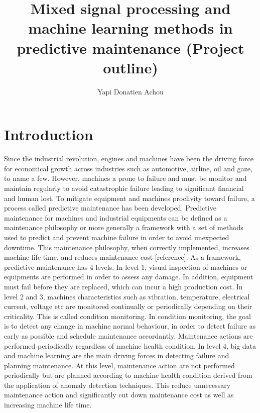\documentclass[11pt, oneside]{article}   	%
\title{Mixed signal processing and machine learning methods in predictive maintenance (Project outline)}
\author{Yapi Donatien Achou}
\begin{document}
\maketitle
\tableofcontents
\newpage
\section{Introduction}
Since the industrial revolution, engines and machines have been the driving force for economical growth across industries such as automotive, airline, oil and gaze, to name a few. However, machines a prone to failure and must be monitor and maintain regularly to avoid catastrophic failure leading to significant financial and human lost. To mitigate equipment and machines proclivity toward failure, a process called predictive maintenance has been developed. Predictive maintenance  for machines and industrial equipments can be defined as a maintenance philosophy or more generally a framework with a set of methods used to predict and prevent machine failure in order to avoid unexpected downtime. This maintenance philosophy, when correctly implemented, increases machine life time, and reduces maintenance cost [reference].
\justify
As a framework, predictive maintenance has 4 levels. In level 1, visual inspection of machines or equipments are performed in order to assess any damage.
In addition, equipment must fail before they are replaced, which can incur a high production cost. In level 2 and 3, machines characteristics such as vibration, temperature, electrical current, voltage etc are monitored continually or periodically depending on their criticality. This is called condition monitoring. In condition monitoring, the goal is to detect any change in machine normal behaviour, in order to detect failure as early as possible and schedule maintenance accordantly. Maintenance actions are performed periodically regardless of machine health condition. In level 4, big data and machine learning are the main driving forces in detecting failure and planning maintenance. At this level, maintenance action are not performed periodically but are planned according to machine health condition derived from the application of anomaly detection techniques. This reduce unnecessary maintenance action and significantly cut down maintenance cost as well as increasing machine life time.
\end{document}
